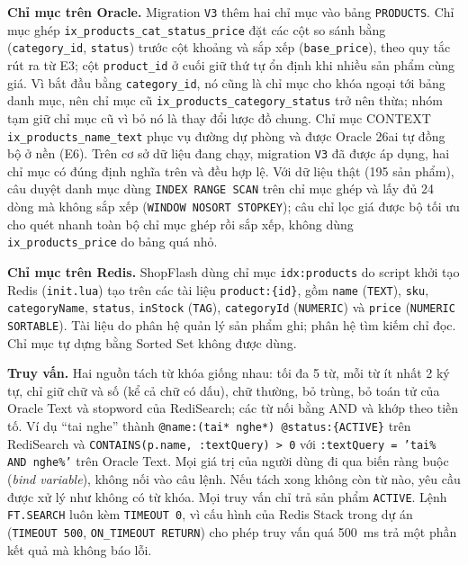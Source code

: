\noindent\textbf{Chỉ mục trên Oracle.} Migration \texttt{V3} thêm hai chỉ mục vào bảng \texttt{PRODUCTS}. Chỉ mục ghép \texttt{ix\_products\_cat\_status\_price} đặt các cột so sánh bằng (\texttt{category\_id}, \texttt{status}) trước cột khoảng và sắp xếp (\texttt{base\_price}), theo quy tắc rút ra từ E3; cột \texttt{product\_id} ở cuối giữ thứ tự ổn định khi nhiều sản phẩm cùng giá. Vì bắt đầu bằng \texttt{category\_id}, nó cũng là chỉ mục cho khóa ngoại tới bảng danh mục, nên chỉ mục cũ \texttt{ix\_products\_category\_status} trở nên thừa; nhóm tạm giữ chỉ mục cũ vì bỏ nó là thay đổi lược đồ chung. Chỉ mục CONTEXT \texttt{ix\_products\_name\_text} phục vụ đường dự phòng và được Oracle 26ai tự đồng bộ ở nền (E6). Trên cơ sở dữ liệu đang chạy, migration \texttt{V3} đã được áp dụng, hai chỉ mục có đúng định nghĩa trên và đều hợp lệ. Với dữ liệu thật (195 sản phẩm), câu duyệt danh mục dùng \texttt{INDEX RANGE SCAN} trên chỉ mục ghép và lấy đủ 24 dòng mà không sắp xếp (\texttt{WINDOW NOSORT STOPKEY}); câu chỉ lọc giá được bộ tối ưu cho quét nhanh toàn bộ chỉ mục ghép rồi sắp xếp, không dùng \texttt{ix\_products\_price} do bảng quá nhỏ.

\noindent\textbf{Chỉ mục trên Redis.} ShopFlash dùng chỉ mục \texttt{idx:products} do script khởi tạo Redis (\texttt{init.lua}) tạo trên các tài liệu \texttt{product:\{id\}}, gồm \texttt{name} (\texttt{TEXT}), \texttt{sku}, \texttt{categoryName}, \texttt{status}, \texttt{inStock} (\texttt{TAG}), \texttt{categoryId} (\texttt{NUMERIC}) và \texttt{price} (\texttt{NUMERIC SORTABLE}). Tài liệu do phân hệ quản lý sản phẩm ghi; phân hệ tìm kiếm chỉ đọc. Chỉ mục tự dựng bằng Sorted Set không được dùng.

\noindent\textbf{Truy vấn.} Hai nguồn tách từ khóa giống nhau: tối đa 5 từ, mỗi từ ít nhất 2 ký tự, chỉ giữ chữ và số (kể cả chữ có dấu), chữ thường, bỏ trùng, bỏ toán tử của Oracle Text và stopword của RediSearch; các từ nối bằng AND và khớp theo tiền tố. Ví dụ ``tai nghe'' thành \texttt{@name:(tai* nghe*) @status:\{ACTIVE\}} trên RediSearch và \texttt{CONTAINS(p.name, :textQuery) > 0} với \texttt{:textQuery = 'tai\% AND nghe\%'} trên Oracle Text. Mọi giá trị của người dùng đi qua biến ràng buộc (\emph{bind variable}), không nối vào câu lệnh. Nếu tách xong không còn từ nào, yêu cầu được xử lý như không có từ khóa. Mọi truy vấn chỉ trả sản phẩm \texttt{ACTIVE}. Lệnh \texttt{FT.SEARCH} luôn kèm \texttt{TIMEOUT 0}, vì cấu hình của Redis Stack trong dự án (\texttt{TIMEOUT 500}, \texttt{ON\_TIMEOUT RETURN}) cho phép truy vấn quá 500~ms trả một phần kết quả mà không báo lỗi.

